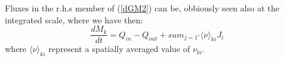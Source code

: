 Fluxes in the r.h.s member of (\ref{dGM2}) can be, obbiously seen also at the integrated scale, where we have then:
\begin{equation}
\frac{dM_k}{dt} = Q_{in} - Q_{out} + sum_{j=1^r} \langle\nu \rangle_{ki} J_i
\end{equation}
where $\langle\nu \rangle_{ki}$ represent a spatially averaged value of $\nu_{ki}$.
